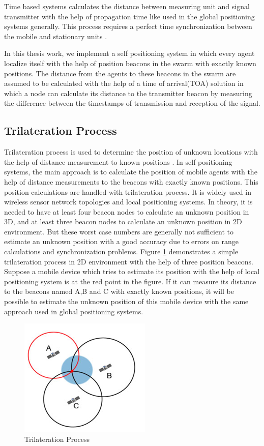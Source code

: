 Time based systems calculates the distance between measuring unit and signal transmitter with the help of propagation time like used in the global positioning systems generally. This process requires a perfect time synchronization between the mobile and stationary units \cite{20}.

In this thesis work, we implement a self positioning system in which every agent localize itself with the help of position beacons in the swarm with exactly known positions. The distance from the agents to these beacons in the swarm are assumed to be calculated with the help of a time of arrival(TOA) solution in which a node can calculate its distance to the transmitter beacon by measuring the difference between the timestamps of transmission and reception of the signal. 


\subsection{Trilateration Process} \label{Trilateration_Process_ref}

Trilateration process is used to determine the position of unknown locations with the help of distance measurement to known positions \cite{22}. In self positioning systems, the main approach is to calculate the position of mobile agents with the help of distance measurements to the beacons with exactly known positions. This position calculations are handled with trilateration process. It is widely used in wireless sensor network topologies and local positioning systems.  In theory, it is needed to have at least four beacon nodes to calculate an unknown position in 3D, and at least three beacon nodes to calculate an unknown position in 2D environment. But these worst case numbers are generally not sufficient to estimate an unknown position with a good accuracy due to errors on range calculations and synchronization problems. Figure \ref{trilateration_ref} demonstrates a simple trilateration process in 2D environment with the help of  three position beacons. Suppose a mobile device which tries to estimate its position with the help of local positioning system is at the red point in the figure. If it can measure its distance to the beacons named A,B and C with exactly known positions, it will be possible to estimate the unknown position of this mobile device with the same approach used in global positioning systems. 


\begin{figure}[H]
	\caption{Trilateration Process \cite{101}} \label{trilateration_ref}
	\centering
	\includegraphics[scale = 1]{trilateration}
\end{figure}

